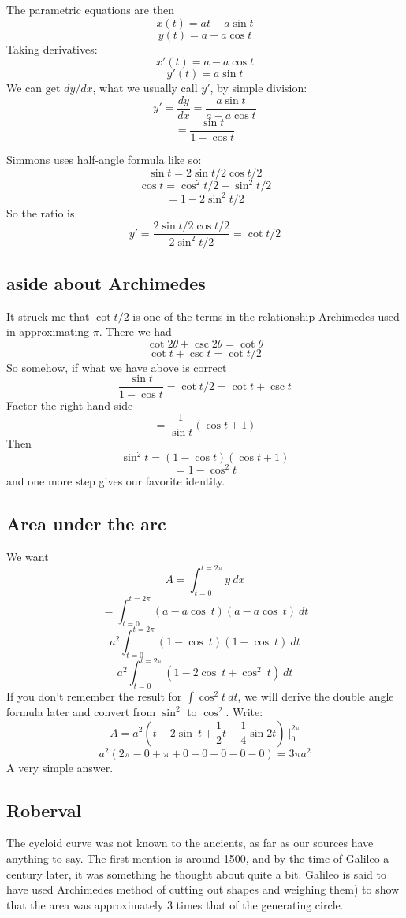 \documentclass[11pt, oneside]{article}
\begin{document}
The parametric equations are then
\[ x(t) = at - a \sin t \]
\[ y(t) = a - a \cos t \]
Taking derivatives:
\[ x'(t) = a - a \cos t \]
\[ y'(t) = a \sin t  \]
We can get $dy/dx$, what we usually call $y'$, by simple division:
\[ y' = \frac{dy}{dx} = \frac{a \sin t }{a - a \cos t} \]
\[ = \frac{\sin t}{1 - \cos t} \]

Simmons uses half-angle formula like so:
\[ \sin t = 2 \sin t/2 \cos t/2 \]
\[ \cos t = \cos^2 t/2 - \sin^2 t/2 \]
\[ = 1 - 2 \sin^2 t/2 \]
So the ratio is
\[ y' = \frac{ 2 \sin t/2 \cos t/2}{2 \sin^2 t/2} = \cot t/2 \]

\subsection*{aside about Archimedes}

It struck me that $\cot t/2$ is one of the terms in the relationship Archimedes used in approximating $\pi$.  There we had
\[ \cot 2 \theta + \csc 2 \theta = \cot \theta \]
\[ \cot t + \csc t = \cot t/2 \]
So somehow, if what we have above is correct
\[ \frac{\sin t}{1 - \cos t} = \cot t/2 = \cot t + \csc t \]
Factor the right-hand side
\[  = \frac{1}{\sin t} (\cos t + 1) \]
Then
\[ \sin^2 t = (1 - \cos t)(\cos t + 1) \]
\[ = 1 - \cos^2 t \]
and one more step gives our favorite identity.

\subsection*{Area under the arc}
We want
\[ A = \int_{t=0}^{t=2\pi} y \ dx \]
\[ = \int_{t=0}^{t=2\pi} (a - a \cos\ t) (a - a \cos\ t) \ dt \]
\[ a^2\int_{t=0}^{t=2\pi} (1 - \cos\ t) (1 - \cos\ t) \ dt \]
\[ a^2\int_{t=0}^{t=2\pi} (1 - 2 \cos\ t + \cos^2\ t) \ dt \]
If you don't remember the result for $\int \cos^2 t \ dt$, we will derive the double angle formula later and convert from $\sin^2$ to $\cos^2$.  Write:
\[ A = a^2 ( t - 2 \sin \ t + \frac{1}{2}t + \frac{1}{4} \sin 2t ) \ \bigg|_0^{2\pi} \]
\[ a^2 ( 2\pi - 0 + \pi + 0 - 0 + 0 - 0 - 0    ) = 3\pi a^2 \]
A very simple answer.

\subsection*{Roberval}
The cycloid curve was not known to the ancients, as far as our sources have anything to say.  The first mention is around 1500, and by the time of Galileo a century later, it was something he thought about quite a bit.  Galileo is said to have used Archimedes method of cutting out shapes and weighing them) to show that the area was approximately $3$ times that of the generating circle.
\end{document}
